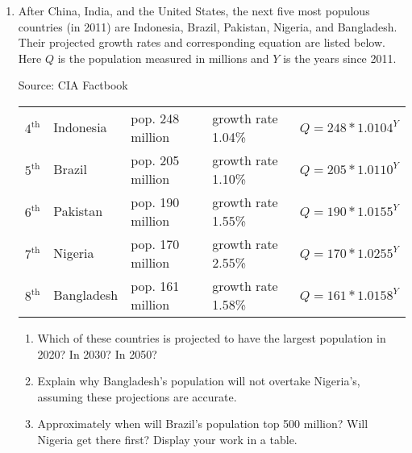 \begin{enumerate}
\newpage %

\item After China, India, and the United States, the next five most populous countries (in 2011) are Indonesia, Brazil, Pakistan, Nigeria, and Bangladesh.  Their projected growth rates and corresponding equation are listed below.  Here $Q$ is the population measured in millions  and $Y$ is the years since 2011. \hfill \begin{footnotesize} Source:  CIA Factbook \end{footnotesize}
\vspace{-.25in} %

\begin{center}
\begin{tabular} {lllll}
$4^{\text{th}}$ & Indonesia \quad ~& pop. 248 million \quad ~& growth rate 1.04\% \quad ~& $Q= 248 \ast 1.0104^Y$\\
$5^{\text{th}}$ & Brazil & pop. 205 million & growth rate 1.10\%& $Q = 205  \ast 1.0110^Y$\\
$6^{\text{th}}$ & Pakistan & pop. 190  million & growth rate 1.55\% & $Q = 190 \ast 1.0155^Y$\\
$7^{\text{th}}$& Nigeria & pop. 170  million & growth rate 2.55\% & $Q = 170 \ast 1.0255^Y$\\
$8^{\text{th}}$ & Bangladesh & pop. 161  million & growth rate 1.58\% & $Q = 161\ast 1.0158^Y$\\
\end{tabular}
\end{center}
\begin{enumerate}
\item Which of these countries is projected to have the largest population in 2020?  In 2030?  In 2050? \vfill
\item Explain why Bangladesh's population will not overtake Nigeria's, assuming these projections are accurate. \vfill
\item Approximately when will Brazil's population top 500 million?  Will Nigeria get there first?  Display your work in a table. \vfill
\end{enumerate}

\end{enumerate}

